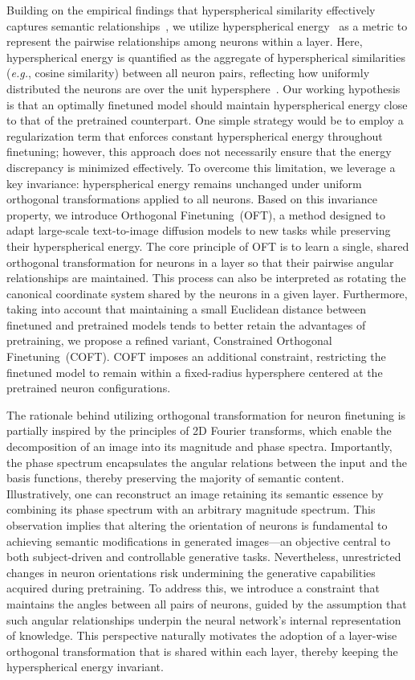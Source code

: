 Building on the empirical findings that hyperspherical similarity effectively captures semantic relationships~\cite{liu2017deep,liu2018decoupled,chen2020angular}, we utilize hyperspherical energy~\cite{liu2018learning} as a metric to represent the pairwise relationships among neurons within a layer. Here, hyperspherical energy is quantified as the aggregate of hyperspherical similarities (\emph{e.g.}, cosine similarity) between all neuron pairs, reflecting how uniformly distributed the neurons are over the unit hypersphere~\cite{liu2021learning}. Our working hypothesis is that an optimally finetuned model should maintain hyperspherical energy close to that of the pretrained counterpart. One simple strategy would be to employ a regularization term that enforces constant hyperspherical energy throughout finetuning; however, this approach does not necessarily ensure that the energy discrepancy is minimized effectively. To overcome this limitation, we leverage a key invariance: hyperspherical energy remains unchanged under uniform orthogonal transformations applied to all neurons. Based on this invariance property, we introduce Orthogonal Finetuning~(OFT), a method designed to adapt large-scale text-to-image diffusion models to new tasks while preserving their hyperspherical energy. The core principle of OFT is to learn a single, shared orthogonal transformation for neurons in a layer so that their pairwise angular relationships are maintained. This process can also be interpreted as rotating the canonical coordinate system shared by the neurons in a given layer. Furthermore, taking into account that maintaining a small Euclidean distance between finetuned and pretrained models tends to better retain the advantages of pretraining, we propose a refined variant, Constrained Orthogonal Finetuning~(COFT). COFT imposes an additional constraint, restricting the finetuned model to remain within a fixed-radius hypersphere centered at the pretrained neuron configurations.

The rationale behind utilizing orthogonal transformation for neuron finetuning is partially inspired by the principles of 2D Fourier transforms, which enable the decomposition of an image into its magnitude and phase spectra. Importantly, the phase spectrum encapsulates the angular relations between the input and the basis functions, thereby preserving the majority of semantic content. Illustratively, one can reconstruct an image retaining its semantic essence by combining its phase spectrum with an arbitrary magnitude spectrum. This observation implies that altering the orientation of neurons is fundamental to achieving semantic modifications in generated images—an objective central to both subject-driven and controllable generative tasks. Nevertheless, unrestricted changes in neuron orientations risk undermining the generative capabilities acquired during pretraining. To address this, we introduce a constraint that maintains the angles between all pairs of neurons, guided by the assumption that such angular relationships underpin the neural network’s internal representation of knowledge. This perspective naturally motivates the adoption of a layer-wise orthogonal transformation that is shared within each layer, thereby keeping the hyperspherical energy invariant.

